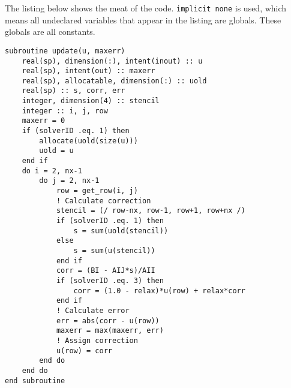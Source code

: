 
The listing below shows the meat of the code.
\texttt{implicit none} is used,
which means all undeclared variables that appear in the listing are globals.
These globals are all constants.
\begin{lstlisting}[caption={Relevant part of the linear solver.
\texttt{solverID} is a global integer variable that has the mapping:
1=Jacobi, 2=Gauss, 3=SOR},
label=lst:fortran]
subroutine update(u, maxerr)
    real(sp), dimension(:), intent(inout) :: u
    real(sp), intent(out) :: maxerr
    real(sp), allocatable, dimension(:) :: uold
    real(sp) :: s, corr, err
    integer, dimension(4) :: stencil
    integer :: i, j, row
    maxerr = 0
    if (solverID .eq. 1) then
        allocate(uold(size(u)))
        uold = u
    end if
    do i = 2, nx-1
        do j = 2, nx-1
            row = get_row(i, j)
            ! Calculate correction
            stencil = (/ row-nx, row-1, row+1, row+nx /)
            if (solverID .eq. 1) then
                s = sum(uold(stencil))
            else
                s = sum(u(stencil))
            end if
            corr = (BI - AIJ*s)/AII
            if (solverID .eq. 3) then
                corr = (1.0 - relax)*u(row) + relax*corr
            end if
            ! Calculate error
            err = abs(corr - u(row))
            maxerr = max(maxerr, err)
            ! Assign correction
            u(row) = corr
        end do
    end do
end subroutine
\end{lstlisting}
